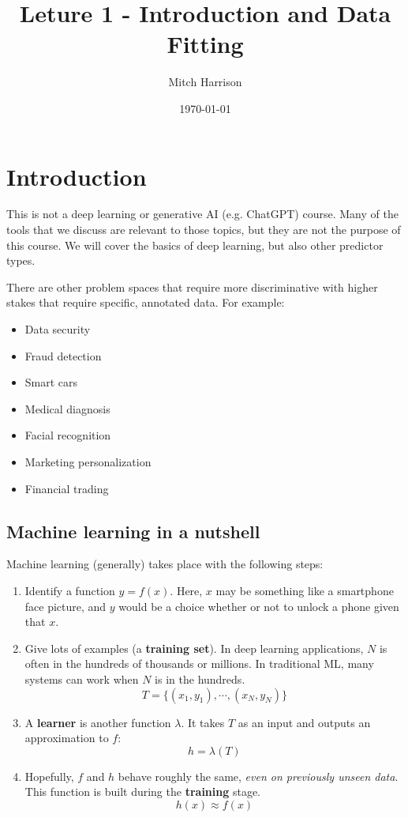 \documentclass[titlepage, 12pt, leqno]{article}
\title{\Huge{Leture 1 - Introduction and Data Fitting}}
\author{\large{Mitch Harrison}}
\date{\today}
\begin{document}
\setlength{\parskip}{1\baselineskip}
\setlength{\parindent}{15pt}
\maketitle
\tableofcontents
\newpage


\section{Introduction}

This is not a deep learning or generative AI (e.g. ChatGPT) course. Many of the
tools that we discuss are relevant to those topics, but they are not the purpose
of this course. We will cover the basics of deep learning, but also other 
predictor types.

There are other problem spaces that require more discriminative with higher stakes
that require specific, annotated data. For example:
\begin{itemize}
    \item Data security
    \item Fraud detection
    \item Smart cars
    \item Medical diagnosis
    \item Facial recognition
    \item Marketing personalization
    \item Financial trading
\end{itemize}

\subsection{Machine learning in a nutshell}
Machine learning (generally) takes place with the following steps:
\begin{enumerate}
    \item Identify a function $y = f(x)$. Here, $x$ may be something like a
        smartphone face picture, and $y$ would be a choice whether or not to 
        unlock a phone given that $x$.
    \item Give lots of examples (a \textbf{training set}). In deep learning
        applications, $N$ is often in the hundreds of thousands or millions. In
        traditional ML, many systems can work when $N$ is in the hundreds.
        \[
            T = \{(x_1, y_1), \cdots , (x_N, y_N)\}
        \]
    \item A \textbf{learner} is another function $\lambda$. It takes $T$ as an
        input and outputs an approximation to $f$:
        \[
            h = \lambda(T)
        \]
    \item Hopefully, $f$ and $h$ behave roughly the same, \textit{even on 
        previously unseen data}. This function is built during the 
        \textbf{training} stage.
        \[
            h(x) \approx f(x)
        \]
\end{enumerate}
\end{document}
